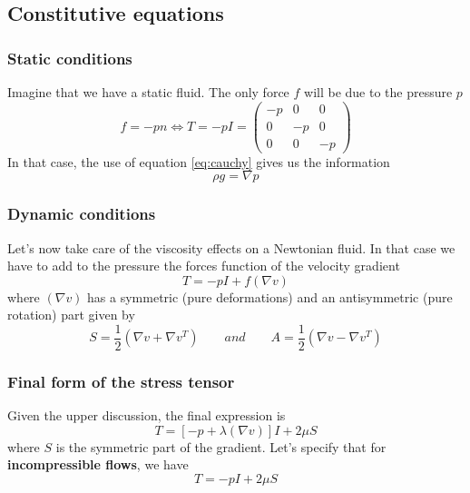 	\subsection{Constitutive equations}
		\subsubsection{Static conditions}
			Imagine that we have a static fluid. The only force $f$ will be due to the pressure $p$ 
			\begin{equation}
				f = -pn \Leftrightarrow T = -pI = 
				\left(
				\begin{array}{ccc}
				-p & 0 & 0 \\ 
				0 & -p & 0 \\ 
				0 & 0 & -p
				\end{array} 
				\right)
			\end{equation}
			In that case, the use of equation \autoref{eq:cauchy} gives us the information
			\begin{equation}
				\rho g = \nabla p
			\end{equation}
			
		\subsubsection{Dynamic conditions}
			Let's now take care of the viscosity effects on a Newtonian fluid. In that case we have to add to the pressure the forces function of the velocity gradient 
			\begin{equation}
				T = -pI + f(\nabla v)
			\end{equation}
			where $(\nabla v)$ has a symmetric (pure deformations) and an antisymmetric (pure rotation) part given by
			\begin{equation}
				S = \frac{1}{2}(\nabla v + \nabla v ^T) \qquad and \qquad A = \frac{1}{2}(\nabla v - \nabla v ^T)
			\end{equation}
		
		\subsubsection{Final form of the stress tensor}
		Given the upper discussion, the final expression is 
		\begin{equation}
			T = \left[ -p + \lambda (\nabla v) \right]I + 2\mu S	
		\end{equation}		 
		where $S$ is the symmetric part of the gradient. Let's specify that for \textbf{incompressible flows}, we have
		\begin{equation}
			T = -pI + 2\mu S
			\label{eq:incompressible}
		\end{equation}
		
